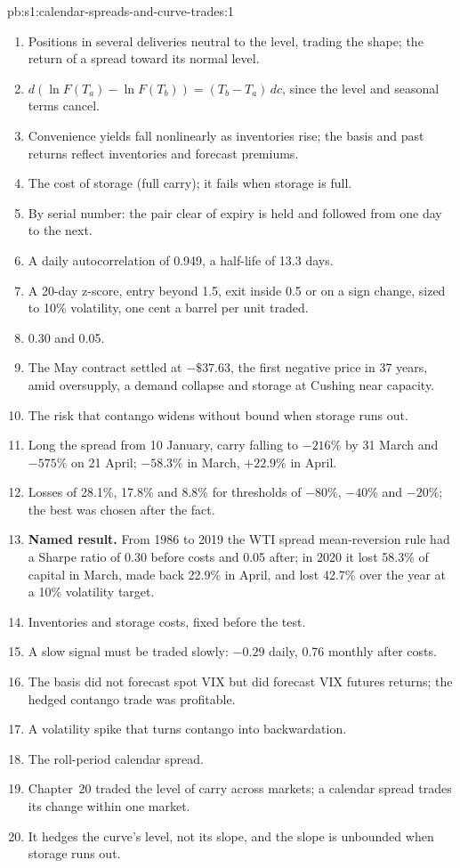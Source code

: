 \begin{solution}{pb:s1:calendar-spreads-and-curve-trades:1}
\begin{enumerate}
\item Positions in several deliveries neutral to the level, trading the shape; the return of a spread toward its normal level.
\item $d(\ln F(T_a) - \ln F(T_b)) = (T_b - T_a)\,dc$, since the level and seasonal terms cancel.
\item Convenience yields fall nonlinearly as inventories rise; the basis and past returns reflect inventories and forecast premiums.
\item The cost of storage (full carry); it fails when storage is full.
\item By serial number: the pair clear of expiry is held and followed from one day to the next.
\item A daily autocorrelation of 0.949, a half-life of 13.3 days.
\item A 20-day z-score, entry beyond 1.5, exit inside 0.5 or on a sign change, sized to 10\% volatility, one cent a barrel per unit traded.
\item 0.30 and 0.05.
\item The May contract settled at $-\$37.63$, the first negative price in 37 years, amid oversupply, a demand collapse and storage at Cushing near
capacity.
\item The risk that contango widens without bound when storage runs out.
\item Long the spread from 10 January, carry falling to $-216\%$ by 31 March and $-575\%$ on 21 April; $-58.3\%$ in March, $+22.9\%$ in April.
\item Losses of 28.1\%, 17.8\% and 8.8\% for thresholds of $-80\%$, $-40\%$ and $-20\%$; the best was chosen after the fact.
\item \textbf{Named result.} From 1986 to 2019 the WTI spread mean-reversion rule had a Sharpe ratio of 0.30 before costs and 0.05 after; in 2020 it lost
58.3\% of capital in March, made back 22.9\% in April, and lost 42.7\% over the year at a 10\% volatility target.
\item Inventories and storage costs, fixed before the test.
\item A slow signal must be traded slowly: $-0.29$ daily, 0.76 monthly after costs.
\item The basis did not forecast spot VIX but did forecast VIX futures returns; the hedged contango trade was profitable.
\item A volatility spike that turns contango into backwardation.
\item The roll-period calendar spread.
\item Chapter~20 traded the level of carry across markets; a calendar spread trades its change within one market.
\item It hedges the curve's level, not its slope, and the slope is unbounded when storage runs out.
\end{enumerate}
\end{solution}

